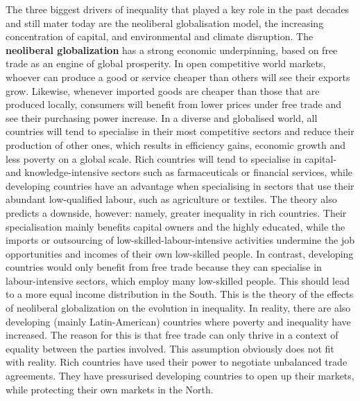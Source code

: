 \documentclass[../summary.tex]{subfiles}
\begin{document}
	The three biggest drivers of inequality that played a key role in the past decades and still mater today are the neoliberal globalisation model, the increasing concentration of capital, and environmental and climate disruption.
	\newpage
	The \textbf{neoliberal globalization} has a strong economic underpinning, based on free trade as an engine of global prosperity. In open competitive world markets, whoever can produce a good or service cheaper than others will see their exports grow. Likewise, whenever imported goods are cheaper than those that are produced locally, consumers will benefit from lower prices under free trade and see their purchasing power increase. In a diverse and globalised world, all countries will tend to specialise in their most competitive sectors and reduce their production of other ones, which results in efficiency gains, economic growth and less poverty on a global scale. Rich countries will tend to specialise in capital- and knowledge-intensive sectors such as farmaceuticals or financial services, while developing countries have an advantage when specialising in sectors that use their abundant low-qualified labour, such as agriculture or textiles. The theory also predicts a downside, however: namely, greater inequality in rich countries. Their specialisation mainly benefits capital owners and the highly educated, while the imports or outsourcing of low-skilled-labour-intensive activities undermine the job opportunities and incomes of their own low-skilled people. In contrast, developing countries would only benefit from free trade because they can specialise in labour-intensive sectors, which employ many low-skilled people. This should lead to a more equal income distribution in the South. This is the theory of the effects of neoliberal globalization on the evolution in inequality. In reality, there are also developing (mainly Latin-American) countries where poverty and inequality have increased. The reason for this is that free trade can only thrive in a context of equality between the parties involved. This assumption obviously does not fit with reality. Rich countries have used their power to negotiate unbalanced trade agreements. They have pressurised developing countries to open up their markets, while protecting their own markets in the North.
	\\\\
\end{document}
